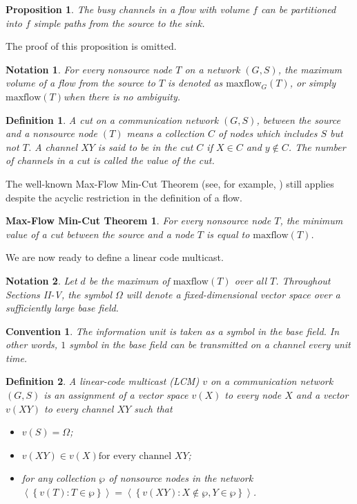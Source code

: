 \documentclass[journal]{IEEEtran}
\newcounter{foo}[section]
\newtheorem{prop}{Proposition}[foo]
\newtheorem*{nota}{Notation}
\newtheorem*{defi}{Definition}
\newtheorem*{conv}{Convention}
\newtheorem*{maxthe}{Max-Flow Min-Cut Theorem}
\begin{document}
\begin{prop}
The busy channels in a flow with volume $f$ can be partitioned into $f$ simple paths from the source to the sink.
\end{prop}


\par The proof of this proposition is omitted.
\begin{nota}
	For every nonsource node $T$ on a network $(G,S)$, the maximum volume of a flow from the source to $T$ is denoted as $\text{maxflow}_G(T)$, or simply $\text{maxflow}(T)$when there is no ambiguity.
\end{nota}

\begin{defi}
	A cut on a communication network $(G,S)$, between the source and a nonsource node $(T)$ means a collection $C$ of nodes which includes $S$ but not $T$. A channel $XY$ is said to be \emph{in} the cut $C$ if $X \in C$ and $y \notin C$. The number of channels in a cut is called the \emph{value} of the cut.
\end{defi}


\par
The well-known Max-Flow Min-Cut Theorem (see, for example, \cite{Lawler2001Combinatorial}) still applies despite the acyclic restriction in the definition of a flow.
\begin{maxthe}
	For every nonsource node $T$, the minimum value of a cut between the source and a node $T$ is equal to $\text{maxflow}(T)$.
\end{maxthe}


We are now ready to define a linear code multicast.
\begin{nota}
	Let $d$ be the maximum of $\text{maxflow}(T)$ over all $T$. Throughout Sections II-V, the symbol $\Omega$ will denote a fixed-dimensional vector space over a sufficiently large base field.
\end{nota}


\begin{conv}
	The information unit is taken as a symbol in the base field. In other words, $1$ symbol in the base field can be transmitted on a channel every unit time.
\end{conv}


\begin{defi}
	A \emph{linear-code multicast (LCM)} $v$ on a communication network $(G,S)$ is an assignment of a vector space $v(X)$	to every node $X$ and a vector $v(XY)$ to every channel $XY$ such that
	\begin{itemize}
		\item[1)] $v(S)=\Omega$;
		\item[2)] $v(XY) \in v(X) \text{for every channel } XY$;
		\item[3)] for any collection $\wp$ of nonsource nodes in the network\\
		$ \left \langle \left \{ v(T):T\in \wp \right \} \right \rangle=\left \langle \left \{ v(XY):X\notin \wp,Y\in \wp \right \} \right \rangle$.
	\end{itemize}
\end{defi}
\end{document}
